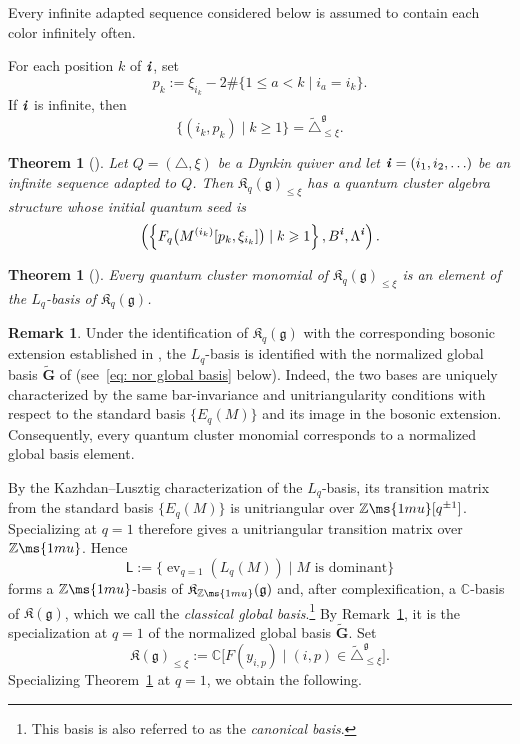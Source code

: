 \documentclass[12pt, leqno]{amsart}
\numberwithin{equation}{section}
\theoremstyle{plain}
\newtheorem{theorem}[lemma]{Theorem}
\theoremstyle{definition}
\newtheorem{remark}[lemma]{Remark}
\renewcommand{\le}{\leqslant}
\renewcommand{\ge}{\geqslant}
\newcommand{\seteq}{\mathbin{:=}}
\newcommand{\ev}{{\operatorname{ev}}}
\newcommand{\g}{\mathfrak{g}}
\newcommand{\C}{\mathbb{C}}
\newcommand{\Z}{\mathbb{Z}\ms{1mu}}
\newcommand{\La}{\Lambda}
\newcommand{\Dynkin}{\triangle}
\newcommand{\ii}{ \textbf{\textit{i}}}
\newcommand{\frakK}{\mathfrak{K}}
\newcommand{\sfL}{\mathsf{L}}
\newcommand{\bfG}{\mathbf{G}}
\newcommand{\tbfG}{\widetilde{\bfG}}
\newcommand{\tDynkin}{{\widetilde{\Dynkin}}}
\begin{document}
Every infinite adapted sequence considered below is assumed to
contain each color infinitely often.


For each position $k$ of $\ii$, set
\[
p_k \seteq \xi_{i_k} - 2\#\{1\le a<k\mid i_a=i_k\}.
\]
If $\ii$ is infinite, then
\[
\{(i_k,p_k)\mid k\ge1\} = \tDynkin_{\le\xi}^\g.
\]



\begin{theorem}[{\cite{HL16,B21,FHOO,JLO1,KKOP24A}}]
\label{thm: cluster structure of K xi}
Let $Q=(\Dynkin,\xi)$ be a Dynkin quiver and let
$\ii=(i_1,i_2,\ldots)$ be an infinite sequence adapted to $Q$.
Then $\frakK_q(\g)_{\le\xi}$ has a quantum cluster algebra
structure whose initial quantum seed is
\[
\left( \left\{F_q\bigl(M^{(i_k)}[p_k,\xi_{i_k}]\bigr) \mid k\ge1 \right\}, B^\ii,\La^\ii \right).
\]
\end{theorem}

\begin{theorem}[{\cite{KKOP24A,Qin20,Qin24B}}]
\label{thm: cluster monomials and global basis}
Every quantum cluster monomial of
$\frakK_q(\g)_{\le\xi}$ is an element of the $L_q$-basis of
$\frakK_q(\g)$.
\end{theorem}

\begin{remark}\label{rem: Lq global basis}
Under the identification of $\frakK_q(\g)$ with the corresponding
bosonic extension established in \cite{HL15,JLO2}, the $L_q$-basis
is identified with the normalized global basis $\tbfG$ of \cite{KKOP24} (see~\eqref{eq: nor global basis} below).
Indeed, the two bases are uniquely characterized by the same
bar-invariance and unitriangularity conditions with respect to the
 standard basis $\{E_q(M)\}$ and its image in the bosonic extension.  Consequently, every quantum
cluster monomial corresponds to a normalized global basis element.
\end{remark}

By the Kazhdan--Lusztig characterization of the $L_q$-basis, its
transition matrix from the  standard basis $\{E_q(M)\}$ is unitriangular over
$\Z[q^{\pm1}]$.  Specializing at $q=1$ therefore gives a
unitriangular transition matrix over $\Z$.  Hence
\[
\sfL\seteq
\{\ev_{q=1}(L_q(M))\mid M\text{ is dominant}\}
\]
forms a $\Z$-basis of $\frakK_{\Z}(\g)$ and, after complexification,
a $\C$-basis of $\frakK(\g)$, which we call the \emph{classical global basis}.\footnote{This basis is also referred
to as the \emph{canonical basis}.}
By Remark~\ref{rem: Lq global basis}, it is the specialization at
$q=1$ of the normalized global basis $\tbfG$.
Set
\[
\frakK(\g)_{\le\xi} \seteq \C\bigl[ F(y_{i,p}) \mid (i,p)\in\tDynkin_{\le\xi}^\g \bigr].
\]
Specializing Theorem~\ref{thm: cluster structure of K xi} at
$q=1$, we obtain the following.
\end{document}
